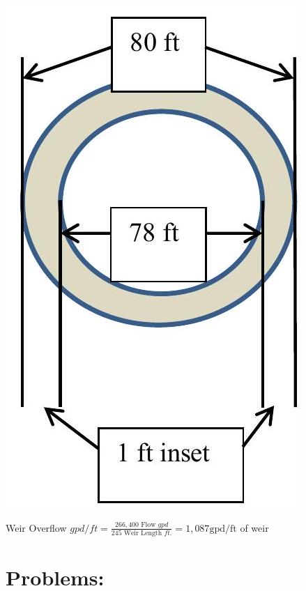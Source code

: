 \documentclass[10pt]{article}
\begin{document}
\includegraphics[max width=\textwidth]{2022_09_16_0c6b804a9b26a8df4e8fg-15}

Weir Overflow $g p d / f t=\frac{266,400 \text { Flow } g p d}{245 \text { Weir Length } f t .}=1,087 \mathrm{gpd} / \mathrm{ft}$ of weir

\section{Problems:}
\end{document}

